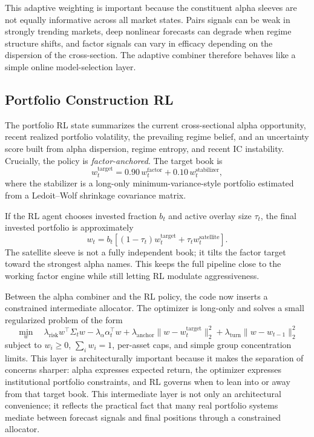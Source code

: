 \documentclass[11pt]{article}
\begin{document}
This adaptive weighting is important because the constituent alpha sleeves are
not equally informative across all market states. Pairs signals can be weak in
strongly trending markets, deep nonlinear forecasts can degrade when regime
structure shifts, and factor signals can vary in efficacy depending on the
dispersion of the cross-section. The adaptive combiner therefore behaves like a
simple online model-selection layer.

\subsection{Portfolio Construction RL}

The portfolio RL state summarizes the current cross-sectional alpha
opportunity, recent realized portfolio volatility, the prevailing regime
belief, and an uncertainty score built from alpha dispersion, regime entropy,
and recent IC instability. Crucially, the policy is \emph{factor-anchored}. The
target book is
\[
w_t^{\text{target}} =
0.90\,w_t^{\text{factor}} +
0.10\,w_t^{\text{stabilizer}},
\]
where the stabilizer is a long-only minimum-variance-style portfolio estimated
from a Ledoit--Wolf shrinkage covariance matrix.

If the RL agent chooses invested fraction $b_t$ and active overlay size $\tau_t$,
the final invested portfolio is approximately
\[
w_t =
b_t \left[(1-\tau_t)w_t^{\text{target}} + \tau_t w_t^{\text{satellite}}\right].
\]
The satellite sleeve is not a fully independent book; it tilts the factor target
toward the strongest alpha names. This keeps the full pipeline close to the
working factor engine while still letting RL modulate aggressiveness.

Between the alpha combiner and the RL policy, the code now inserts a constrained
intermediate allocator. The optimizer is long-only and solves a small
regularized problem of the form
\[
\min_w \quad
\lambda_{\mathrm{risk}} w^\top \Sigma_t w
- \lambda_{\alpha}\alpha_t^\top w
+ \lambda_{\mathrm{anchor}}\lVert w - w_t^{\mathrm{target}} \rVert_2^2
+ \lambda_{\mathrm{turn}}\lVert w - w_{t-1} \rVert_2^2
\]
subject to $w_i \ge 0$, $\sum_i w_i = 1$, per-asset caps, and simple group
concentration limits. This layer is architecturally important because it makes
the separation of concerns sharper: alpha expresses expected return, the
optimizer expresses institutional portfolio constraints, and RL governs when to
lean into or away from that target book.
This intermediate layer is not only an architectural convenience; it reflects
the practical fact that many real portfolio systems mediate between forecast
signals and final positions through a constrained allocator.
\end{document}
